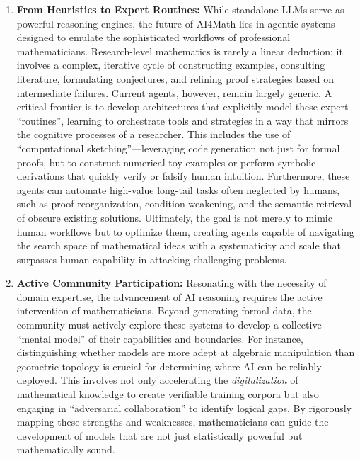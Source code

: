 \documentclass[11pt]{article}
\numberwithin{equation}{section}
\begin{document}
\begin{enumerate}
    \item \textbf{From Heuristics to Expert Routines:} While standalone LLMs serve as powerful reasoning engines, the future of AI4Math lies in agentic systems designed to emulate the sophisticated workflows of professional mathematicians. Research-level mathematics is rarely a linear deduction; it involves a complex, iterative cycle of constructing examples, consulting literature, formulating conjectures, and refining proof strategies based on intermediate failures. Current agents, however, remain largely generic. A critical frontier is to develop architectures that explicitly model these expert ``routines'', learning to orchestrate tools and strategies in a way that mirrors the cognitive processes of a researcher. This includes the use of ``computational sketching''—leveraging code generation not just for formal proofs, but to construct numerical toy-examples or perform symbolic derivations that quickly verify or falsify human intuition. Furthermore, these agents can automate high-value long-tail tasks often neglected by humans, such as proof reorganization, condition weakening, and the semantic retrieval of obscure existing solutions. Ultimately, the goal is not merely to mimic human workflows but to optimize them, creating agents capable of navigating the search space of mathematical ideas with a systematicity and scale that surpasses human capability in attacking challenging problems.

    \item \textbf{Active Community Participation:} Resonating with the necessity of domain expertise, the advancement of AI reasoning requires the active intervention of mathematicians. Beyond generating formal data, the community must actively explore these systems to develop a collective ``mental model'' of their capabilities and boundaries. For instance, distinguishing whether models are more adept at algebraic manipulation than geometric topology is crucial for determining where AI can be reliably deployed. This involves not only accelerating the \textit{digitalization} of mathematical knowledge to create verifiable training corpora but also engaging in ``adversarial collaboration'' to identify logical gaps. By rigorously mapping these strengths and weaknesses, mathematicians can guide the development of models that are not just statistically powerful but mathematically sound.
    

\end{enumerate}
\end{document}
